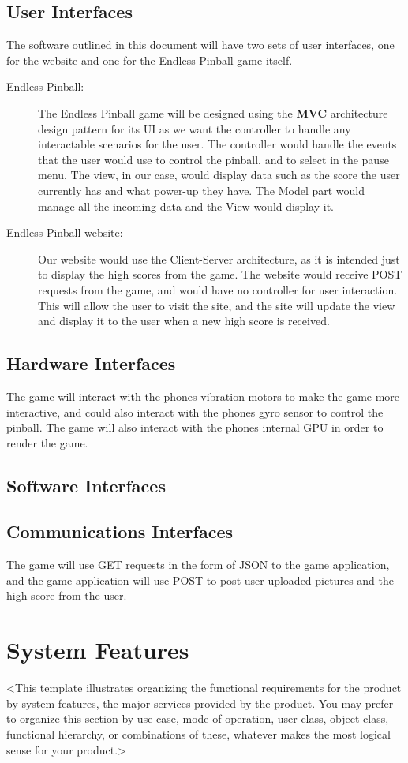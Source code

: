 \documentclass[11pt]{article}
\begin{document}
\subsection{User Interfaces}
\label{sec:org7d8a8ab}
The software outlined in this document will have two sets of user interfaces, one for the website and one for the Endless Pinball game itself. 
\begin{description}
\item[{Endless Pinball:}] The Endless Pinball game will be designed using the \textbf{MVC} architecture design pattern for its UI as we want the controller to handle any interactable scenarios for the user. The controller would handle the events that the user would use to control the pinball, and to select in the pause menu. The view, in our case, would display data such as the score the user currently has and what power-up they have. The Model part would manage all the incoming data and the View would display it.
\item[{Endless Pinball website:}] Our website would use the Client-Server architecture, as it is intended just to display the high scores from the game. The website would receive POST requests from the game, and would have no controller for user interaction. This will allow the user to visit the site, and the site will update the view and display it to the user when a new high score is received.
\end{description}
\subsection{Hardware Interfaces}
\label{sec:org4a58e6b}
The game will interact with the phones vibration motors to make the game more interactive, and could also interact with the phones gyro sensor to control the pinball. The game will also interact with the phones internal GPU in order to render the game. 
\subsection{Software Interfaces}
\label{sec:org738f8b9}
\subsection{Communications Interfaces}
\label{sec:org769a772}
The game will use GET requests in the form of JSON to the game application, and the game application will use POST to post user uploaded pictures and the high score from the user. 
\section{System Features}
\label{sec:orga4fd58b}
<This template illustrates organizing the functional requirements for the product by system
features, the major services provided by the product. You may prefer to organize this section by
use case, mode of operation, user class, object class, functional hierarchy, or combinations of
these, whatever makes the most logical sense for your product.>
\end{document}
